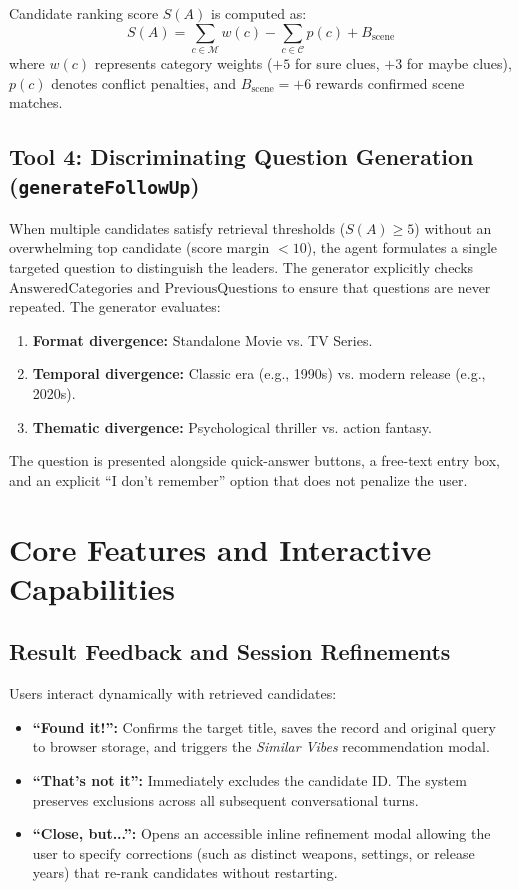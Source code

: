 \documentclass[11pt,a4paper]{article}
\begin{document}
Candidate ranking score $S(A)$ is computed as:
\begin{equation}
S(A) = \sum_{c \in \mathcal{M}} w(c) - \sum_{c \in \mathcal{C}} p(c) + B_{\text{scene}}
\end{equation}
where $w(c)$ represents category weights ($+5$ for sure clues, $+3$ for maybe clues), $p(c)$ denotes conflict penalties, and $B_{\text{scene}} = +6$ rewards confirmed scene matches.

\subsection{Tool 4: Discriminating Question Generation (\texttt{generateFollowUp})}
When multiple candidates satisfy retrieval thresholds ($S(A) \ge 5$) without an overwhelming top candidate (score margin $< 10$), the agent formulates a single targeted question to distinguish the leaders. The generator explicitly checks $\text{AnsweredCategories}$ and $\text{PreviousQuestions}$ to ensure that questions are never repeated. The generator evaluates:
\begin{enumerate}[noitemsep]
    \item \textbf{Format divergence:} Standalone Movie vs. TV Series.
    \item \textbf{Temporal divergence:} Classic era (e.g., 1990s) vs. modern release (e.g., 2020s).
    \item \textbf{Thematic divergence:} Psychological thriller vs. action fantasy.
\end{enumerate}
The question is presented alongside quick-answer buttons, a free-text entry box, and an explicit ``I don't remember'' option that does not penalize the user.

\section{Core Features and Interactive Capabilities}
\label{sec:features}

\subsection{Result Feedback and Session Refinements}
Users interact dynamically with retrieved candidates:
\begin{itemize}[noitemsep]
    \item \textbf{“Found it!”:} Confirms the target title, saves the record and original query to browser storage, and triggers the \textit{Similar Vibes} recommendation modal.
    \item \textbf{“That’s not it”:} Immediately excludes the candidate ID. The system preserves exclusions across all subsequent conversational turns.
    \item \textbf{“Close, but...”:} Opens an accessible inline refinement modal allowing the user to specify corrections (such as distinct weapons, settings, or release years) that re-rank candidates without restarting.
\end{itemize}
\end{document}
